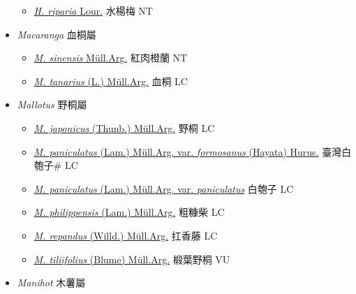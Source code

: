 \begin{itemize}
  \begin{itemize}
        \item[] \href{http://www.theplantlist.org/tpl1.1/search?q=Homonoia+riparia}{\textit{H. riparia} Lour.}   水楊梅 NT
  \end{itemize}
 \item[] \textit{Macaranga} 血桐屬
                    
  \begin{itemize}
        \item[] \href{http://www.theplantlist.org/tpl1.1/search?q=Macaranga+sinensis}{\textit{M. sinensis} Müll.Arg.}   紅肉橙蘭 NT
        \item[] \href{http://www.theplantlist.org/tpl1.1/search?q=Macaranga+tanarius}{\textit{M. tanarius} (L.) Müll.Arg.}   血桐 LC
  \end{itemize}
 \item[] \textit{Mallotus} 野桐屬
                    
  \begin{itemize}
        \item[] \href{http://www.theplantlist.org/tpl1.1/search?q=Mallotus+japonicus}{\textit{M. japonicus} (Thunb.) Müll.Arg.}   野桐 LC
        \item[] \href{http://www.theplantlist.org/tpl1.1/search?q=Mallotus+paniculatus+var.+formosanus}{\textit{M. paniculatus} (Lam.) Müll.Arg. var. \textit{formosanus} (Hayata) Hurus.}   臺灣白匏子\# LC
        \item[] \href{http://www.theplantlist.org/tpl1.1/search?q=Mallotus+paniculatus+var.+paniculatus}{\textit{M. paniculatus} (Lam.) Müll.Arg. var. \textit{paniculatus}}   白匏子 LC
        \item[] \href{http://www.theplantlist.org/tpl1.1/search?q=Mallotus+philippensis}{\textit{M. philippensis} (Lam.) Müll.Arg.}   粗糠柴 LC
        \item[] \href{http://www.theplantlist.org/tpl1.1/search?q=Mallotus+repandus}{\textit{M. repandus} (Willd.) Müll.Arg.}   扛香藤 LC
        \item[] \href{http://www.theplantlist.org/tpl1.1/search?q=Mallotus+tiliifolius}{\textit{M. tiliifolius} (Blume) Müll.Arg.}   椴葉野桐 VU
  \end{itemize}
 \item[] \textit{Manihot} 木薯屬
                    

\end{itemize}
